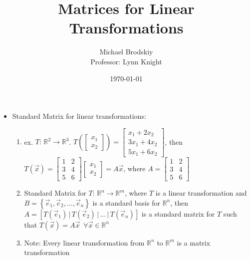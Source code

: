 \documentclass[12pt]{article}
\title{Matrices for Linear Transformations}
\date{\today}
\author{Michael Brodskiy\\ \small Professor: Lynn Knight}
\begin{document}
\maketitle

\begin{itemize}

  \item Standard Matrix for linear transformations:

    \begin{enumerate}

      \item ex. $T:\,\mathbb{R}^2\rightarrow\mathbb{R}^3$. $T\left( \begin{bmatrix} x_1\\x_2\end{bmatrix} \right)=\begin{bmatrix} x_1+2x_2\\3x_1+4x_2\\5x_1+6x_2\end{bmatrix}$, then $T(\overrightarrow{x})=\begin{bmatrix} 1 & 2\\3&4\\5&6\end{bmatrix}\begin{bmatrix}x_1\\x_2\end{bmatrix}=A\overrightarrow{x}$, where $A=\begin{bmatrix}1&2\\3&4\\5&6\end{bmatrix}$

      \item Standard Matrix for $T:\,\mathbb{R}^n\rightarrow\mathbb{R}^m$, where $T$ is a linear transformation and $B=\left\{ \overrightarrow{e}_1,\overrightarrow{e}_2,\dots,\overrightarrow{e}_n \right\}$ is a standard basis for $\mathbb{R}^n$, then $A=\left[ T(\overrightarrow{e}_1)\,\Big|\,T(\overrightarrow{e}_2)\,\Big|\,\dots\,\Big|\,T(\overrightarrow{e}_n) \right]$ is a standard matrix for $T$ such that $T(\overrightarrow{x})=A\overrightarrow{x} \,\,\,\forall\overrightarrow{x}\in\mathbb{R}^n$

      \item Note: Every linear transformation from $\mathbb{R}^n$ to $\mathbb{R}^m$ is a matrix transformation

    \end{enumerate}
    

\end{itemize}
\end{document}
